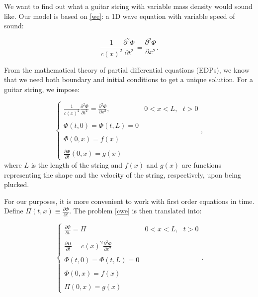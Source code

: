 \documentclass{article}
\begin{document}
We want to find out what a guitar string with variable mass density would sound like. Our model is based on \eqref{we}: a 1D wave equation with variable speed of sound:

\begin{equation}\label{we}
\boxed{\frac{1}{c(x)^2}\frac{\partial^2 \Phi}{\partial t^2}=\frac{\partial^2 \Phi}{\partial x^2}.}
\end{equation}

From the mathematical theory of partial differential equations (EDPs), we know that we need both boundary and initial conditions to get a unique solution. For a guitar string, we impose:

\begin{equation}\label{cwe}
\left\{\begin{array}{cc}
\displaystyle\frac{1}{c(x)^2}\frac{\partial^2 \Phi}{\partial t^2}=\frac{\partial^2 \Phi}{\partial x^2},&0<x<L,\text{ }t>0\\
\text{ }&\text{ }\\
\displaystyle \Phi(t,0)=\Phi(t,L)=0&\text{ }\\
\text{ }&\text{ }\\
\displaystyle\Phi(0,x)=f(x)&\text{ }\\
\text{ }&\text{ }\\
\displaystyle\frac{\partial \Phi}{\partial t}(0,x)=g(x)&\text{ }
\end{array}\right.,
\end{equation}
where $L$ is the length of the string and $f(x)$ and $g(x)$ are functions representing the shape and the velocity of the string, respectively, upon being plucked.

For our purposes, it is more convenient to work with first order equations in time. Define $\Pi(t,x)\equiv\displaystyle\frac{\partial \Phi}{\partial t}$. The problem \eqref{cwe} is then translated into:

\begin{equation}\label{cweII}
\left\{\begin{array}{cc}
\displaystyle\frac{\partial \Phi}{\partial t}=\Pi&0<x<L,\text{ }t>0\\
\text{ }&\text{ }\\
\displaystyle\frac{\partial \Pi}{\partial t}=c(x)^2\frac{\partial^2 \Phi}{\partial x^2}&\text{ }\\
\text{ }&\text{ }\\
\displaystyle \Phi(t,0)=\Phi(t,L)=0&\text{ }\\
\text{ }&\text{ }\\
\displaystyle\Phi(0,x)=f(x)&\text{ }\\
\text{ }&\text{ }\\
\displaystyle\Pi(0,x)=g(x)&\text{ }
\end{array}\right..
\end{equation}
\end{document}
